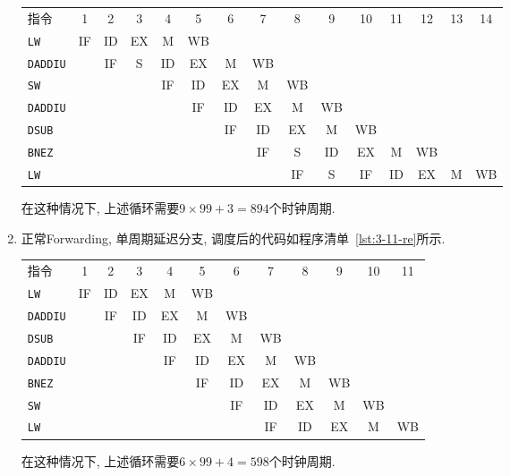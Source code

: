 \begin{solve}
\begin{enumerate}
    \begin{flushleft}
      \footnotesize
      \begin{tabular}{@{~}lc@{~}c@{~}c@{~}c@{~}c@{~}c@{~}c@{~}c@{~}c@{~}c@{~}c@{~}c@{~}c@{~}c@{~}}
        指令
        & 1  & 2  & 3  & 4  & 5  & 6  & 7  & 8  & 9  & 10 & 11 & 12 & 13 & 14 \\
        \texttt{LW}     & IF & ID & EX & M  & WB \\
        \texttt{DADDIU} &    & IF & S  & ID & EX & M  & WB \\
        \texttt{SW}     &    &    &    & IF & ID & EX & M  & WB \\
        \texttt{DADDIU} &    &    &    &    & IF & ID & EX & M  & WB \\
        \texttt{DSUB}   &    &    &    &    &    & IF & ID & EX & M  & WB \\
        \texttt{BNEZ}   &    &    &    &    &    &    & IF & S  & ID & EX & M  & WB \\
        \texttt{LW}     &    &    &    &    &    &    &    & IF & S  & IF & ID & EX & M  & WB \\
      \end{tabular}
    \end{flushleft}

    在这种情况下, 上述循环需要$9\times{}99 + 3 = 894$个时钟周期.
    
  \item 正常Forwarding, 单周期延迟分支, 调度后的代码如程序清单~\ref{lst:3-11-re}所示.

    
    
    \begin{flushleft}
      \footnotesize
      \begin{tabular}{@{~}lc@{~}c@{~}c@{~}c@{~}c@{~}c@{~}c@{~}c@{~}c@{~}c@{~}c@{~}}
        指令
        & 1  & 2  & 3  & 4  & 5  & 6  & 7  & 8  & 9  & 10 & 11 \\
        \texttt{LW}     & IF & ID & EX & M  & WB \\
        \texttt{DADDIU} &    & IF & ID & EX & M  & WB \\
        \texttt{DSUB}   &    &    & IF & ID & EX & M  & WB \\
        \texttt{DADDIU} &    &    &    & IF & ID & EX & M  & WB \\
        \texttt{BNEZ}   &    &    &    &    & IF & ID & EX & M  & WB \\
        \texttt{SW}     &    &    &    &    &    & IF & ID & EX & M  & WB \\
        \texttt{LW}     &    &    &    &    &    &    & IF & ID & EX & M  & WB \\
      \end{tabular}
    \end{flushleft}

    在这种情况下, 上述循环需要$6\times{}99 + 4 = 598$个时钟周期.
  \end{enumerate}
\end{solve}
